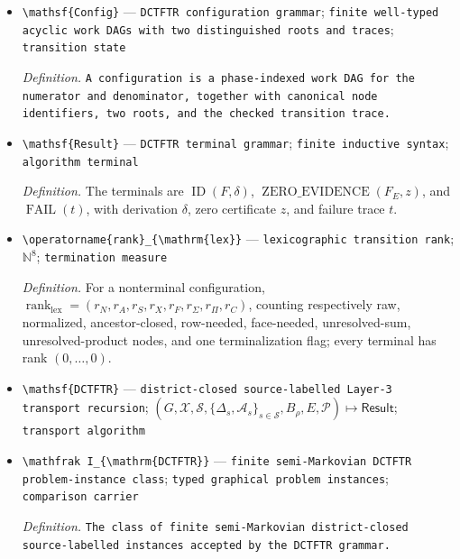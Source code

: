 \documentclass{article}
\begin{document}
\begin{itemize}
  \item \texttt{\textbackslash{}\allowbreak{}mathsf\{Config\}\allowbreak{}} --- \texttt{DCTFTR configuration grammar}; \texttt{finite well-\allowbreak{}typed acyclic work DAGs with two distinguished roots and traces}; \texttt{transition state}
  \par\smallskip\noindent\emph{Definition.} \texttt{A configuration is a phase-\allowbreak{}indexed work DAG for the numerator and denominator,\allowbreak{} together with canonical node identifiers,\allowbreak{} two roots,\allowbreak{} and the checked transition trace.}
  \item \texttt{\textbackslash{}\allowbreak{}mathsf\{Result\}\allowbreak{}} --- \texttt{DCTFTR terminal grammar}; \texttt{finite inductive syntax}; \texttt{algorithm terminal}
  \par\smallskip\noindent\emph{Definition.} The terminals are \(\operatorname{ID}(F,\delta)\), \(\operatorname{ZERO\_EVIDENCE}(F_E,z)\), and \(\operatorname{FAIL}(t)\), with derivation \(\delta\), zero certificate \(z\), and failure trace \(t\).
  \item \texttt{\textbackslash{}\allowbreak{}operatorname\{rank\}\allowbreak{}\_\allowbreak{}\{\textbackslash{}\allowbreak{}mathrm\{lex\}\allowbreak{}\}\allowbreak{}} --- \texttt{lexicographic transition rank}; \(\mathbb N^8\); \texttt{termination measure}
  \par\smallskip\noindent\emph{Definition.} For a nonterminal configuration, \(\operatorname{rank}_{\mathrm{lex}}=(r_N,r_A,r_S,r_X,r_F,r_{\Sigma},r_{\Pi},r_C)\), counting respectively raw, normalized, ancestor-closed, row-needed, face-needed, unresolved-sum, unresolved-product nodes, and one terminalization flag; every terminal has rank \((0,\ldots,0)\).
  \item \texttt{\textbackslash{}\allowbreak{}mathsf\{DCTFTR\}\allowbreak{}} --- \texttt{district-\allowbreak{}closed source-\allowbreak{}labelled Layer-\allowbreak{}3 transport recursion}; \((G,\mathcal X,\mathcal S,\{\Delta_s,\mathcal A_s\}_{s\in\mathcal S},B_\rho,E,\mathcal P)\mapsto\mathsf{Result}\); \texttt{transport algorithm}
  \item \texttt{\textbackslash{}\allowbreak{}mathfrak I\_\allowbreak{}\{\textbackslash{}\allowbreak{}mathrm\{DCTFTR\}\allowbreak{}\}\allowbreak{}} --- \texttt{finite semi-\allowbreak{}Markovian DCTFTR problem-\allowbreak{}instance class}; \texttt{typed graphical problem instances}; \texttt{comparison carrier}
  \par\smallskip\noindent\emph{Definition.} \texttt{The class of finite semi-\allowbreak{}Markovian district-\allowbreak{}closed source-\allowbreak{}labelled instances accepted by the DCTFTR grammar.}

\end{itemize}
\end{document}
